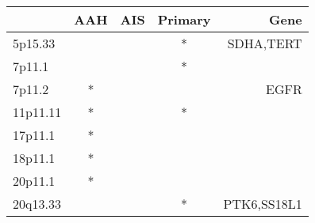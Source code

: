 \begin{tabular}{lcccr}
\toprule
{} & AAH & AIS & Primary &         Gene \\
\midrule
5p15.33  &     &     &       * &    SDHA,TERT \\
7p11.1   &     &     &       * &              \\
7p11.2   &   * &     &         &         EGFR \\
11p11.11 &   * &     &       * &              \\
17p11.1  &   * &     &         &              \\
18p11.1  &   * &     &         &              \\
20p11.1  &   * &     &         &              \\
20q13.33 &     &     &       * &  PTK6,SS18L1 \\
\bottomrule
\end{tabular}
